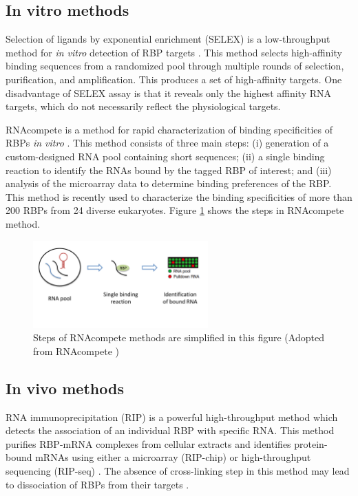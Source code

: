 \subsection{In vitro methods}

Selection of ligands by exponential enrichment (SELEX) is a low-throughput method for \textit{in vitro} detection of RBP targets \cite{ellington_90}. This method selects high-affinity binding sequences from a randomized pool through multiple rounds of selection, purification, and amplification. This produces a set of high-affinity targets. One disadvantage of SELEX assay is that it reveals only the highest affinity RNA targets, which do not necessarily reflect the physiological targets.

RNAcompete is a method for rapid characterization of binding specificities of RBPs \textit{in vitro} \cite{ray_2009}. This method consists of three main steps: (i) generation of a custom-designed RNA pool containing short sequences; (ii) a single binding reaction to identify the RNAs bound by the tagged RBP of interest; and (iii) analysis of the microarray data to determine binding preferences of the RBP. This method is recently used to characterize the binding specificities of more than 200 RBPs from 24 diverse eukaryotes. Figure \ref{RNAcompete} shows the steps in RNAcompete method.

\begin{figure}[H]
   \centering
   \includegraphics[width=0.6\textwidth,clip]{ch2_background/figures/RNAcompete.pdf}
\caption[Steps in RNAcompete method]{Steps of RNAcompete methods are simplified in this figure (Adopted from RNAcompete \cite{rnacompete_09})}
\label{RNAcompete}
\end{figure}


\subsection{In vivo methods}

RNA immunoprecipitation (RIP) is a powerful high-throughput method which detects the association of an individual RBP with specific RNA. This method purifies RBP-mRNA complexes from cellular extracts and identifies protein-bound mRNAs using either a microarray (RIP-chip) or high-throughput sequencing (RIP-seq) \cite{keene_06, zhao_10}. The absence of cross-linking step in this method may lead to dissociation of RBPs from their targets \cite{mili_2004}.

